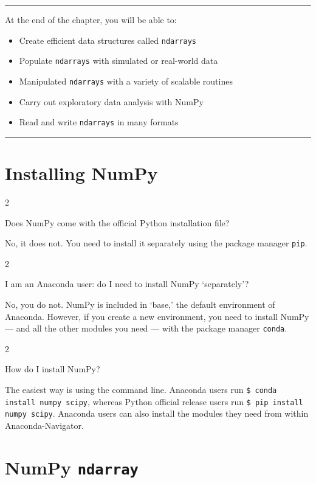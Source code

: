 \documentclass[a4paper,11pt]{book}
\newcommand{\question}[1]{%
    \begin{tcolorbox}[colback=comp_c!10,colframe=comp_c,sidebyside align=top,width=\linewidth,before skip=1ex]
        #1
    \end{tcolorbox}
    \switchcolumn%
}
\newcommand{\note}[1]{%
    \begin{tcolorbox}[colback=white!0,colframe=white!10,width=\linewidth,before skip=1ex]
        #1
    \end{tcolorbox}
}
\begin{document}
\par\noindent\rule{\textwidth}{0.4pt}

At the end of the chapter, you will be able to:
\begin{itemize}
	\item Create efficient data structures called \texttt{ndarrays}
	\item Populate \texttt{ndarrays} with simulated or real-world data
	\item Manipulated \texttt{ndarrays} with a variety of scalable routines
	\item Carry out exploratory data analysis with NumPy
	\item Read and write \texttt{ndarrays} in many formats
\end{itemize}

\par\noindent\rule{\textwidth}{0.4pt}

\vspace{1em}

\section{Installing NumPy}

\begin{paracol}{2}
	\question{\raggedright Does NumPy come with the official Python installation file?}
	\note{No, it does not. You need to install it separately using the package manager \texttt{pip}.}
\end{paracol}

\begin{paracol}{2}
	\question{\raggedright I am an Anaconda user: do I need to install NumPy `separately'?}
	\note{No, you do not. NumPy is included in `base,' the default environment of Anaconda. However, if you create a new environment, you need to install NumPy --- and all the other modules you need --- with the package manager \texttt{conda}.}
\end{paracol}

\begin{paracol}{2}
	\question{\raggedright How do I install NumPy?}
	\note{The easiest way is using the command line. Anaconda users run \texttt{\$ conda install numpy scipy}, whereas Python official release users run \texttt{\$ pip install numpy scipy}. Anaconda users can also install the modules they need from within Anaconda-Navigator.}
\end{paracol}
\clearpage

\section{NumPy \texttt{ndarray}}
\label{sec:np_array}
\end{document}

